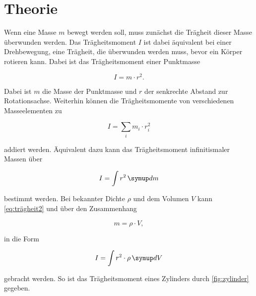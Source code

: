 \section{Theorie}
\label{sec:Theorie}




Wenn eine Masse $m$ bewegt werden soll, muss zunächst die Trägheit dieser Masse überwunden werden. Das Trägheitsmoment $I$ ist dabei äquivalent bei einer Drehbewegung, eine Trägheit, die überwunden werden muss, bevor ein Körper rotieren kann. Dabei ist das Trägheitsmoment einer Punktmasse

\begin{equation}
    I = m \cdot r^2.
    \label{eq:trägheit1}
\end{equation}

Dabei ist $m$ die Masse der Punktmasse und $r$ der senkrechte Abstand zur Rotationsachse. Weiterhin können die Trägheitsmomente von verschiedenen Masseelementen zu 

\begin{equation}
    I = \sum _i m_i \cdot r_i^2
    \label{eq:trägheit1}
\end{equation}

addiert werden. Äquivalent dazu kann das Trägheitsmoment infinitismaler Massen über 

\begin{equation}
    I = \int r^2 \dif{m}
    \label{eq:trägheit2}
\end{equation}

bestimmt werden. Bei bekannter Dichte $\rho$ und dem Volumen $V$ kann \autoref{eq:trägheit2} und über den Zusammenhang

\begin{equation}
    m = \rho \cdot V,
    \label{eq:dichte}
\end{equation}

in die Form 

\begin{equation}
    I = \int r^2 \cdot \rho \dif{V}
    \label{eq:trägheit2}
\end{equation}

gebracht werden. So ist das Trägheitsmoment eines Zylinders durch \autoref{fig:zylinder} gegeben.

